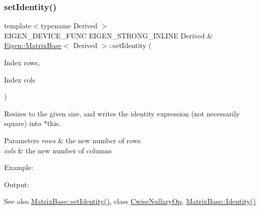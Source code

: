 \subsubsection{\texorpdfstring{setIdentity()}{setIdentity()}\hspace{0.1cm}{\footnotesize\ttfamily [2/2]}}
{\footnotesize\ttfamily template$<$typename Derived $>$ \\
E\+I\+G\+E\+N\+\_\+\+D\+E\+V\+I\+C\+E\+\_\+\+F\+U\+NC E\+I\+G\+E\+N\+\_\+\+S\+T\+R\+O\+N\+G\+\_\+\+I\+N\+L\+I\+NE Derived \& \mbox{\hyperlink{class_eigen_1_1_matrix_base}{Eigen\+::\+Matrix\+Base}}$<$ Derived $>$\+::set\+Identity (\begin{DoxyParamCaption}\item[{Index}]{rows,  }\item[{Index}]{cols }\end{DoxyParamCaption})}



Resizes to the given size, and writes the identity expression (not necessarily square) into $\ast$this. 


\begin{DoxyParams}{Parameters}
{\em rows} & the new number of rows \\
\hline
{\em cols} & the new number of columns\\
\hline
\end{DoxyParams}
Example\+: 
\begin{DoxyCodeInclude}{0}
\end{DoxyCodeInclude}
 Output\+: 
\begin{DoxyVerbInclude}
\end{DoxyVerbInclude}


\begin{DoxySeeAlso}{See also}
\mbox{\hyperlink{class_eigen_1_1_matrix_base_ae05be7fcc1ade707f0b73eb5f9d8cf33}{Matrix\+Base\+::set\+Identity()}}, class \mbox{\hyperlink{class_eigen_1_1_cwise_nullary_op}{Cwise\+Nullary\+Op}}, \mbox{\hyperlink{class_eigen_1_1_matrix_base_a2ef43190f3aba0aef0cf1030d46d0ca7}{Matrix\+Base\+::\+Identity()}} 
\end{DoxySeeAlso}
\mbox{\label{class_eigen_1_1_matrix_base_a320dd291cbf4339c6118c41521b75350}} 
